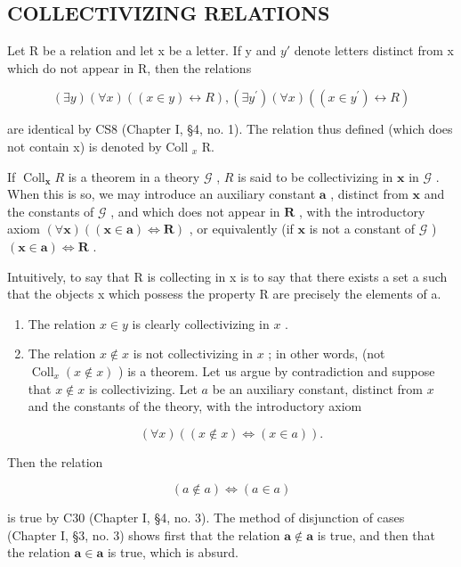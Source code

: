 \subsection{COLLECTIVIZING RELATIONS}

Let R be a relation and let x be a letter. If y and \(y'\) denote letters distinct from x which do not appear in R, then the relations

\[
(\exists y) (\forall x) ((x \in y) \leftrightarrow R), (\exists y ^ {\prime}) (\forall x) ((x \in y ^ {\prime}) \leftrightarrow R)
\]

are identical by CS8 (Chapter I, §4, no. 1). The relation thus defined (which does not contain x) is denoted by Coll \(_{x}\) R.

If \(\operatorname{Coll}_{\mathbf{x}} R\) is a theorem in a theory \(\mathcal{G}\) , \(R\) is said to be collectivizing in \(\mathbf{x}\) in \(\mathcal{G}\) . When this is so, we may introduce an auxiliary constant \(\mathbf{a}\) , distinct from \(\mathbf{x}\) and the constants of \(\mathcal{G}\) , and which does not appear in \(\mathbf{R}\) , with the introductory axiom \((\forall \mathbf{x}) ((\mathbf{x} \in \mathbf{a}) \Longleftrightarrow \mathbf{R})\) , or equivalently (if \(\mathbf{x}\) is not a constant of \(\mathcal{G}\) ) \((\mathbf{x} \in \mathbf{a}) \Longleftrightarrow \mathbf{R}\) .

Intuitively, to say that R is collecting in x is to say that there exists a set a such that the objects x which possess the property R are precisely the elements of a.


\begin{enumerate}
\def\labelenumi{(\arabic{enumi})}
\item
  The relation \(x \in y\) is clearly collectivizing in \(x\) .
\item
  The relation \(x \notin x\) is not collectivizing in \(x\) ; in other words, (not \(\operatorname{Coll}_x(x \notin x)\) ) is a theorem. Let us argue by contradiction and suppose that \(x \notin x\) is collectivizing. Let \(a\) be an auxiliary constant, distinct from \(x\) and the constants of the theory, with the introductory axiom
\end{enumerate}

\[
(\forall x) ((x \notin x) \iff (x \in a)).
\]

Then the relation

\[
(a \notin a) \iff (a \in a)
\]

is true by C30 (Chapter I, §4, no. 3). The method of disjunction of cases (Chapter I, §3, no. 3) shows first that the relation \(\pmb{a} \notin \pmb{a}\) is true, and then that the relation \(\pmb{a} \in \pmb{a}\) is true, which is absurd.

